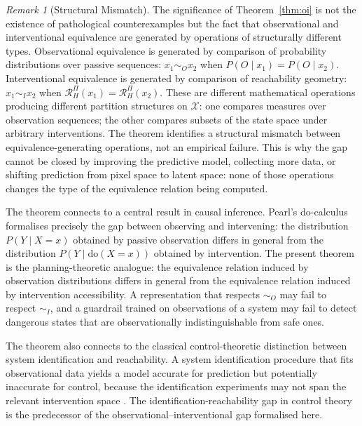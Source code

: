 \documentclass[11pt, a4paper]{article}
\theoremstyle{plain}
\theoremstyle{definition}
\theoremstyle{remark}
\newtheorem{remark}{Remark}
\newcommand{\simO}{\sim_O}
\newcommand{\simI}{\sim_I}
\newcommand{\RHP}{\mathcal{R}_H^\Pi}
\begin{document}
\begin{remark}[Structural Mismatch]
\label{rem:category}
The significance of Theorem~\ref{thm:oi} is not the existence of pathological
counterexamples but the fact that observational and interventional equivalence
are generated by operations of structurally different types. Observational equivalence is
generated by comparison of probability distributions over passive sequences:
$x_1 \simO x_2$ when $P(O \mid x_1) = P(O \mid x_2)$. Interventional
equivalence is generated by comparison of reachability geometry: $x_1 \simI x_2$
when $\RHP(x_1) = \RHP(x_2)$. These are different mathematical operations
producing different partition structures on $\mathcal{X}$: one compares
measures over observation sequences; the other compares subsets of the state
space under arbitrary interventions. The theorem identifies a structural mismatch
between equivalence-generating operations, not an empirical failure. This is why the gap cannot be
closed by improving the predictive model, collecting more data, or shifting
prediction from pixel space to latent space: none of those operations changes
the type of the equivalence relation being computed.
\end{remark}

The theorem connects to a central result in causal inference. Pearl's
do-calculus \citep{pearl2009causality} formalises precisely the gap between
observing and intervening: the distribution $P(Y \mid X = x)$ obtained by
passive observation differs in general from the distribution
$P(Y \mid \mathrm{do}(X = x))$ obtained by intervention. The present theorem
is the planning-theoretic analogue: the equivalence relation induced by
observation distributions differs in general from the equivalence relation
induced by intervention accessibility. A representation that respects
$\simO$ may fail to respect $\simI$, and a guardrail trained on observations
of a system may fail to detect dangerous states that are observationally
indistinguishable from safe ones.

The theorem also connects to the classical control-theoretic distinction between
system identification and reachability. A system identification procedure that
fits observational data yields a model accurate for prediction but potentially
inaccurate for control, because the identification experiments may not span the
relevant intervention space \citep{ljung1999system}. The identification-reachability
gap in control theory is the predecessor of the observational--interventional gap
formalised here.
\end{document}

